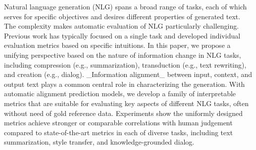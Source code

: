 Natural language generation (NLG) spans a broad range of tasks, each of which serves for specific objectives and desires different properties of generated text. The complexity makes automatic evaluation of NLG particularly challenging. Previous work has typically focused on a single task and developed individual evaluation metrics based on specific intuitions. In this paper, we propose a unifying perspective based on the nature of information change in NLG tasks, including compression (e.g., summarization), transduction (e.g., text rewriting), and creation (e.g., dialog). \_Information alignment\_ between input, context, and output text plays a common central role in characterizing the generation. With automatic alignment prediction models, we develop a family of interpretable metrics that are suitable for evaluating key aspects of different NLG tasks, often without need of gold reference data. Experiments show the uniformly designed metrics achieve stronger or comparable correlations with human judgement compared to state-of-the-art metrics in each of diverse tasks, including text summarization, style transfer, and knowledge-grounded dialog.
